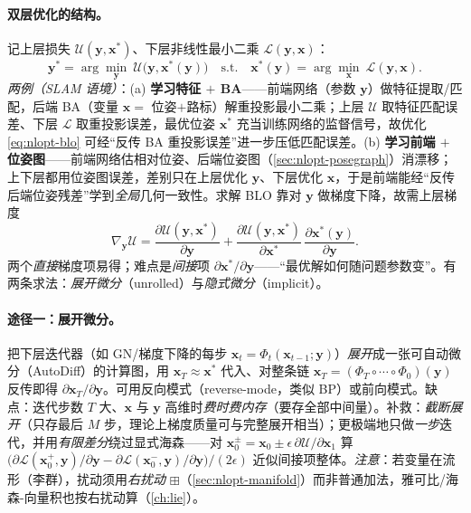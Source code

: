\paragraph{双层优化的结构。}\cite{carlone2026handbook}
记上层损失 $\mathcal{U}(\mathbf{y},\mathbf{x}^*)$、下层非线性最小二乘 $\mathcal{L}(\mathbf{y},\mathbf{x})$：
\begin{equation}
  \mathbf{y}^*=\arg\min_{\mathbf{y}}\ \mathcal{U}\big(\mathbf{y},\mathbf{x}^*(\mathbf{y})\big)
  \quad\text{s.t.}\quad
  \mathbf{x}^*(\mathbf{y})=\arg\min_{\mathbf{x}}\ \mathcal{L}(\mathbf{y},\mathbf{x}).
  \label{eq:nlopt-blo}
\end{equation}
\emph{两例（SLAM 语境）}：(a) \textbf{学习特征 $+$ BA}——前端网络（参数 $\mathbf{y}$）做特征提取/匹配，后端 BA（变量 $\mathbf{x}=$ 位姿$+$路标）解重投影最小二乘；上层 $\mathcal{U}$ 取特征匹配误差、下层 $\mathcal{L}$ 取重投影误差，最优位姿 $\mathbf{x}^*$ 充当训练网络的监督信号，故优化 \cref{eq:nlopt-blo} 可经“反传 BA 重投影误差”进一步压低匹配误差。(b) \textbf{学习前端 $+$ 位姿图}——前端网络估相对位姿、后端位姿图（\cref{sec:nlopt-posegraph}）消漂移；上下层都用位姿图误差，差别只在上层优化 $\mathbf{y}$、下层优化 $\mathbf{x}$，于是前端能经“反传后端位姿残差”学到\emph{全局}几何一致性。求解 BLO 靠对 $\mathbf{y}$ 做梯度下降，故需上层梯度
\begin{equation}
  \nabla_{\mathbf{y}}\mathcal{U}
  =\frac{\partial\mathcal{U}(\mathbf{y},\mathbf{x}^*)}{\partial\mathbf{y}}
  +\frac{\partial\mathcal{U}(\mathbf{y},\mathbf{x}^*)}{\partial\mathbf{x}^*}\,
  \frac{\partial\mathbf{x}^*(\mathbf{y})}{\partial\mathbf{y}}.
  \label{eq:nlopt-blo-grad}
\end{equation}
两个\emph{直接}梯度项易得；难点是\emph{间接}项 $\partial\mathbf{x}^*/\partial\mathbf{y}$——“最优解如何随问题参数变”。有两条求法：\emph{展开微分}（unrolled）与\emph{隐式微分}（implicit）。

\paragraph{途径一：展开微分。}\cite{carlone2026handbook}
把下层迭代器（如 GN/梯度下降的每步 $\mathbf{x}_t=\Phi_t(\mathbf{x}_{t-1};\mathbf{y})$）\emph{展开}成一张可自动微分（AutoDiff）的计算图，用 $\mathbf{x}_T\approx\mathbf{x}^*$ 代入、对整条链 $\mathbf{x}_T=(\Phi_T\circ\cdots\circ\Phi_0)(\mathbf{y})$ 反传即得 $\partial\mathbf{x}_T/\partial\mathbf{y}$。可用反向模式（reverse-mode，类似 BP）或前向模式。缺点：迭代步数 $T$ 大、$\mathbf{x}$ 与 $\mathbf{y}$ 高维时\emph{费时费内存}（要存全部中间量）。补救：\emph{截断展开}（只存最后 $M$ 步，理论上梯度质量可与完整展开相当）；更极端地只做\emph{一步}迭代，并用\emph{有限差分}绕过显式海森——对 $\mathbf{x}_0^\pm=\mathbf{x}_0\pm\epsilon\,\partial\mathcal{U}/\partial\mathbf{x}_1$ 算 $\big(\partial\mathcal{L}(\mathbf{x}_0^+,\mathbf{y})/\partial\mathbf{y}-\partial\mathcal{L}(\mathbf{x}_0^-,\mathbf{y})/\partial\mathbf{y}\big)/(2\epsilon)$ 近似间接项整体。\emph{注意}：若变量在流形（李群），扰动须用\emph{右扰动} $\boxplus$（\cref{sec:nlopt-manifold}）而非普通加法，雅可比/海森-向量积也按右扰动算（\cref{ch:lie}）。

